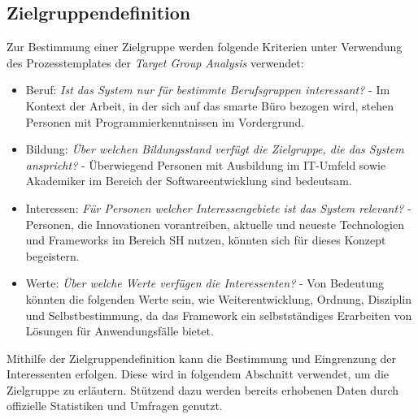     \subsection{Zielgruppendefinition}
    \label{subsec:zielgruppendefinition}
        Zur Bestimmung einer Zielgruppe werden folgende Kriterien unter Verwendung des Prozesstemplates der \textit{Target Group Analysis} verwendet:  
        \begin{itemize}
            \item Beruf: \textit{Ist das System nur für bestimmte Berufsgruppen interessant?} - Im Kontext der Arbeit, in der sich auf das smarte Büro bezogen wird, stehen Personen mit Programmierkenntnissen im Vordergrund. 
            \item Bildung: \textit{Über welchen Bildungsstand verfügt die Zielgruppe, die das System anspricht?} - Überwiegend Personen mit Ausbildung im IT-Umfeld sowie Akademiker im Bereich der Softwareentwicklung sind bedeutsam.
            \item Interessen: \textit{Für Personen welcher Interessengebiete ist das System relevant?} -  Personen, die Innovationen vorantreiben, aktuelle und neueste Technologien und Frameworks im Bereich \acl{SH} nutzen, könnten sich für dieses Konzept begeistern.
            \item Werte: \textit{Über welche Werte verfügen die Interessenten?} - Von Bedeutung könnten die folgenden Werte sein, wie Weiterentwicklung, Ordnung, Disziplin und Selbstbestimmung, da das Framework ein selbstständiges Erarbeiten von Lösungen für Anwendungsfälle bietet. 
        \end{itemize} 
        Mithilfe der Zielgruppendefinition kann die Bestimmung und Eingrenzung der Interessenten erfolgen. Diese wird in 
        folgendem Abschnitt verwendet, um die Zielgruppe zu erläutern. Stützend dazu werden bereits erhobenen Daten durch offizielle 
        Statistiken und Umfragen genutzt.     

